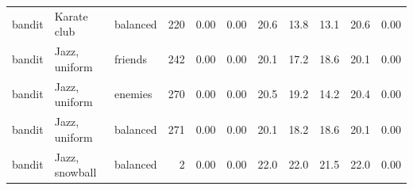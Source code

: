 \begin{table}[!htbp]
{\begin{tabular}{lllrrrrrrrr}
bandit & Karate club & balanced & 220 & 0.00 & 0.00 & 20.6 & 13.8 & 13.1 & 20.6 & 0.00 \\
bandit & Jazz, uniform & friends & 242 & 0.00 & 0.00 & 20.1 & 17.2 & 18.6 & 20.1 & 0.00 \\
bandit & Jazz, uniform & enemies & 270 & 0.00 & 0.00 & 20.5 & 19.2 & 14.2 & 20.4 & 0.00 \\
bandit & Jazz, uniform & balanced & 271 & 0.00 & 0.00 & 20.1 & 18.2 & 18.6 & 20.1 & 0.00 \\
bandit & Jazz, snowball & balanced & 2 & 0.00 & 0.00 & 22.0 & 22.0 & 21.5 & 22.0 & 0.00 \\
\bottomrule
\end{tabular}}
\end{table}
